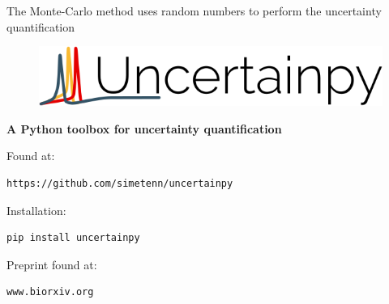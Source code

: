 \documentclass[presentation]{beamer}
\begin{document}
\begin{frame}{The Monte-Carlo method uses random numbers to perform the
              uncertainty quantification}
\begin{figure}
  \end{figure}
\end{frame}



\begin{frame}[fragile]
\vspace{-0.3cm}
\begin{figure}
\includegraphics[width=1\textwidth]{uncertainpy.png}
\end{figure}

{\LARGE \bf A Python toolbox for uncertainty quantification}

\vspace{0.8cm}

Found at:

\begin{lstlisting}
https://github.com/simetenn/uncertainpy
\end{lstlisting}


Installation:

\begin{lstlisting}
pip install uncertainpy
\end{lstlisting}


Preprint found at:

\begin{lstlisting}
www.biorxiv.org
 \end{lstlisting}


\end{frame}
\end{document}
